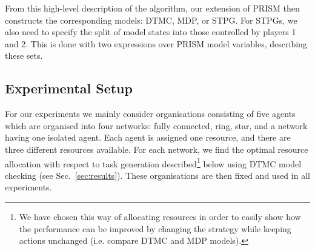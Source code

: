\documentclass{llncs}
\begin{document}
From this high-level description of the algorithm, our extension of PRISM then constructs the corresponding models: DTMC, MDP, or STPG.
For STPGs, we also need to specify the split of model states into those controlled by players 1 and 2.
This is done with two expressions over PRISM model variables, describing these sets.
\subsection{Experimental Setup}
\label{subsec:exp_set}
For our experiments we mainly consider organisations consisting of five agents which are organised into four networks: fully connected, ring, star, and a network having one isolated agent. Each agent is assigned one resource, and there are three different resources available. For each network, we find the optimal resource allocation with respect to task generation described\footnote{We have chosen this way of allocating resources in order to easily show how the performance can be improved by changing the strategy while keeping actions unchanged (i.e. compare DTMC and MDP models).} below using DTMC model checking (see Sec.~\ref{sec:results}). These organisations are then fixed and used in all experiments.
\end{document}
